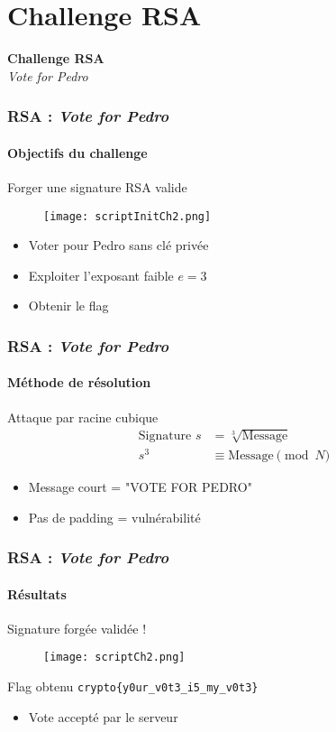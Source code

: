 
\section{Challenge RSA}


\begin{frame}
    \centering
    \Huge{\bfseries Challenge RSA}\\[1.5em]
    \huge{\textit{Vote for Pedro}}
\end{frame}

\begin{frame}
    \frametitle{RSA : \textit{Vote for Pedro}}
    \framesubtitle{Objectifs du challenge}
\centering
{\LARGE Forger une signature RSA valide}\\
\begin{figure}
    \centering
    \texttt{[image: scriptInitCh2.png]}
\end{figure}
\vspace{0.1cm}
\begin{itemize}
    \item Voter pour Pedro sans clé privée
    \item Exploiter l'exposant faible $e = 3$
    \item Obtenir le flag
\end{itemize}
\end{frame}

\begin{frame}
    \frametitle{RSA : \textit{Vote for Pedro}}
    \framesubtitle{Méthode de résolution}
\centering
{\LARGE Attaque par racine cubique}
\vspace{0.5cm}
\begin{align*}
\text{Signature } s &= \sqrt[3]{\text{Message}} \\
s^3 &\equiv \text{Message} \pmod{N}
\end{align*}
\begin{itemize}
    \item Message court = "VOTE FOR PEDRO"
    \item Pas de padding = vulnérabilité
\end{itemize}
\end{frame}


\begin{frame}
        \frametitle{RSA : \textit{Vote for Pedro}}
    \framesubtitle{Résultats}
\centering
{\LARGE Signature forgée validée !}
\begin{figure}
    \centering
    \texttt{[image: scriptCh2.png]}
\end{figure}
\vspace{0.1cm}
\begin{block}{Flag obtenu}
\texttt{crypto\{y0ur\_v0t3\_i5\_my\_v0t3\}}
\end{block}
\begin{itemize}
    \item Vote accepté par le serveur
\end{itemize}
\end{frame}
